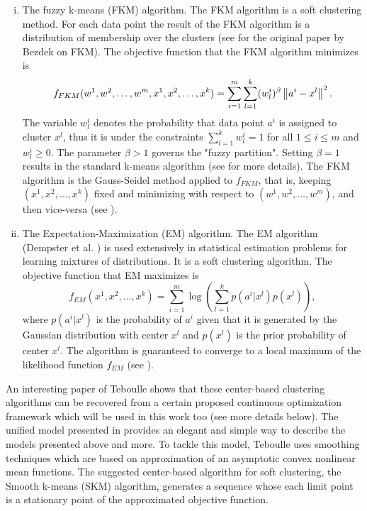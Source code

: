 \begin{enumerate}[(i)]
	\item The fuzzy k-means (FKM) algorithm. The FKM algorithm is a soft clustering method. For each data point the result of the FKM algorithm is a distribution of membership over the clusters (see \cite{B1981} for the original paper by Bezdek on FKM). The objective function that the FKM algorithm minimizes is
	\begin{equation*}
		f_{FKM}(w^1,w^2,\ldots,w^m,x^1,x^2,\ldots,x^k) = \sum\limits_{i=1}^{m}\sum\limits_{l=1}^{k}(w^i_l)^\beta \left\Vert {a^i-x^l} \right\Vert^2.
	\end{equation*}
	The variable $w^i_l$ denotes the probability that data point $a^i$ is assigned to cluster $x^l$, thus it is under the constraints $\sum_{l=1}^{k} w^i_l = 1$ for all $1 \leq i \leq m$ and $w^i_l \geq 0$. The parameter $\beta > 1$ governs the "fuzzy partition". Setting $\beta = 1$ results in the standard k-means algorithm (see  for more details). The FKM algorithm is the Gauss-Seidel method applied to $f_{FKM}$, that is, keeping $\left(x^1,x^2,\ldots,x^k\right)$ fixed and minimizing with respect to $\left(w^1,w^2,\ldots,w^m\right)$, and then vice-versa (see \cite[p. 528]{DHS2001}).
	\item The Expectation-Maximization (EM) algorithm. The EM algorithm (Dempster et al. \cite{DLR1977}) is used extensively in statistical estimation problems for learning mixtures of distributions. It is a soft clustering algorithm. The objective function that EM maximizes is 
	\begin{equation*}
		f_{EM}(x^1,x^2,\ldots,x^k) = \sum\limits_{i=1}^{m} \log \left( \sum\limits_{l=1}^{k} p\left(a^i|x^l\right) p\left(x^l\right) \right),
	\end{equation*}
	where  $p\left(a^i|x^l\right)$ is the probability of $a^i$ given that it is generated by the Gaussian distribution with center $x^l$ and $p\left(x^l\right)$ is the prior probability of center $x^l$. The algorithm is guaranteed to converge to a local maximum of the likelihood function $f_{EM}$ (see \cite{W1983}).
\end{enumerate}
An interesting paper of Teboulle \cite{T2007} shows that these center-based clustering algorithms can be recovered from a certain proposed continuous optimization framework which will be used in this work too (see more details below). The unified model presented in \cite{T2007} provides an elegant and simple way to describe the models presented above and more. To tackle this model, Teboulle uses smoothing techniques which are based on approximation of an asymptotic convex nonlinear mean functions. The suggested center-based algorithm for soft clustering, the Smooth k-means (SKM) algorithm, generates a sequence whose each limit point is a stationary point of the approximated objective function.\medskip
